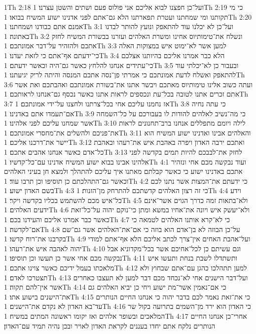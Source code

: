 1Th 2:18  ועל־כן חפצנו לבוא אליכם אני פולוס פעם ושתים והשטן עצרנו׃
1Th 2:19  כי מי תקותנו ומי שמחתנו ועטרת תפארתנו הלא גם־אתם לפני אדנינו ישוע המשיח בבואו׃
1Th 2:20  אמנם אתם כבודנו ושמחתנו׃
1Th 3:1  ועל־כן לא יכלנו עוד להתאפק ונועץ להותר לבדנו באתונה׃
1Th 3:2  ונשלח את־טימותיוס אחינו ומשרת האלהים ועזרנו בבשורת המשיח לחזק אתכם ולהזהיר על־דבר אמונתכם׃
1Th 3:3  למען אשר לא־ימוט איש במצוקות האלה כי־ידעתם אף־אתם כי לזאת יעדנו׃
1Th 3:4  הלא כבר אמרנו אליכם בהיותנו אצלכם כי־עתידים אנחנו להלחץ כאשר גם־היה וכאשר ידעתם׃
1Th 3:5  ובעבור כן לא־יכלתי עוד להתאפק ואשלח לדעת אמונתכם כי אמרתי פן־נסה אתכם המנסה והיתה לריק יגיעתנו׃
1Th 3:6  ועתה כשוב אלינו טימותיוס מאתכם ויבשר אתנו את־בשורת אמונתכם ואהבתכם ואת אשר אתם זכרים אתנו לטובה בכל־עת ונכספים לראות אתנו כאשר נכסף גם־אנחנו לראותכם׃
1Th 3:7  אז נחמנו עליכם אחי בכל־צרתנו ולחצנו על־ידי אמונתכם׃
1Th 3:8  כי עתה נחיה אם־תעמדו אתם באדנינו׃
1Th 3:9  כי מה־נשיב לאלהים להודות לו בעבורכם על כל־השמחה אשר שמחנו עליכם לפני אלהינו׃
1Th 3:10  לילה ויומם מתפללים אנחנו ברב־תחנונים לראות את־פניכם ולהשלים את־מחסרי אמונתכם׃
1Th 3:11  והאלהים אבינו ואדנינו ישוע המשיח הוא יישר את־דרכנו אליכם׃
1Th 3:12  ואתכם ירבה האדון ויפרה באהבת איש את־רעהו ובאהבת כל־אדם כאשר אנחנו אהבים אתכם׃
1Th 3:13  לחזק את־לבבכם להיות תמים בקדשה לפני אלהינו אבינו בבוא ישוע המשיח אדנינו עם־כל־קדשיו׃
1Th 4:1  ועוד נבקשה מכם אחי ונזהיר אתכם באדנינו ישוע כי כאשר קבלתם מאתנו איך עליכם להתהלך ולמצא חן בעיני האלהים וכאשר גם־התהלכתם כן תוסיפו וכן תרבו עוד׃
1Th 4:2  כי ידעתם את־המצות אשר נתנו לכם בשם האדון ישוע׃
1Th 4:3  כי זה רצון האלהים קדשתכם להתרחק מן־הזנות׃
1Th 4:4  וידע כל־איש מכם להשתמש בכליו בקדשה ויקר׃
1Th 4:5  ולא־בתאות זמה כדרך הגוים אשר־אינם ידעים האלהים׃
1Th 4:6  ולא־יעשק איש ויונה את־אחיו במשא ומתן כי־נוקם יהוה על־כל־זאת כאשר כבר אמרנו אליכם והעידנו בכם׃
1Th 4:7  כי לא־קרא אותנו האלהים לטמאה כי אם־לקדשה׃
1Th 4:8  על־כן הבוזה לא בן־אדם הוא בוזה כי אם־את־האלהים אשר גם־שם בקרבנו את־רוח קדשו׃
1Th 4:9  ועל־אהבת האחים אין־צרך לכתב אליכם הלא אף־אתם למודי יהוה לאהבה איש את־רעהו׃
1Th 4:10  וגם עשיתם כן לכל־אחיכם אשר בכל־מקדוניא אבל נבקשה מכם אחי אשר כן תעשו וכן תוסיפו׃
1Th 4:11  ותשתדלו לשבת בנחת ותעשו איש מלאכתו בעמל ידיכם כאשר צוינו אתכם׃
1Th 4:12  למען תתהלכו כהגן עם־אתם שבחוץ ולא תצטרכו לאדם׃
1Th 4:13  ועל־דבר הישנים אחי לא־נכחד מכם דבר למען לא תעצבו כאחרים אשר אין־להם תקוה׃
1Th 4:14  כי אם־נאמין אשר־מת ישוע ויחי כן יביא האלהים גם את־הישנים בישוע אתו׃
1Th 4:15  כי את־זאת נאמר לכם בדבר יהוה כי אנחנו החיים הנותרים עד־בא האדון לא נקדם את־הישנים׃
1Th 4:16  כי האדון הוא ירד מן־השמים בתרועה בקול שר המלאכים ובשופר אלהים ואז יקומו ראשונה המתים במשיח׃
1Th 4:17  אחרי־כן אנחנו החיים הנותרים נלקח אתם יחדו בעננים לקראת האדון לאויר ובכן נהיה תמיד עם־האדון׃

